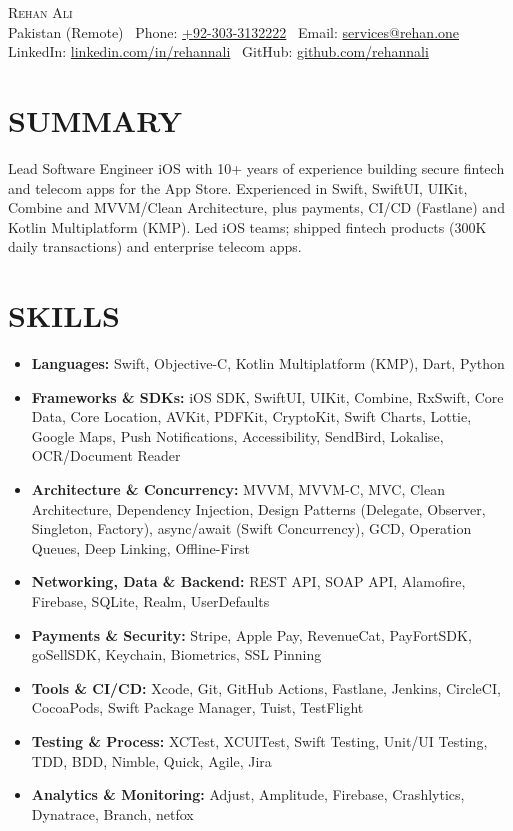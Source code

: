 \documentclass[a4paper,10pt]{article}
\newcommand{\resumeTechSkill}[2]{
    \item\small{
        \textbf{\small{#1:}} \small{#2} \\[-1pt]
    }\vspace{-2pt}
}
\newcommand{\resumeSkillsHeadingListStart}{\begin{itemize}[leftmargin=0.13in, label={}]}
\newcommand{\resumeSkillsHeadingListEnd}{\end{itemize}}
\begin{document}
\begin{center}
    {\Huge \scshape Rehan Ali} \\ \vspace{2pt}
    \small Pakistan (Remote) \textbar\ Phone: \href{tel:+923033132222}{+92-303-3132222} \textbar\ Email: \href{mailto:services@rehan.one}{services@rehan.one} \\
    \small LinkedIn: \href{https://linkedin.com/in/rehannali}{linkedin.com/in/rehannali} \textbar\ GitHub: \href{https://github.com/rehannali}{github.com/rehannali}
\end{center}
\vspace{-15pt}

\section{SUMMARY}
\small Lead Software Engineer iOS with 10+ years of experience building secure fintech and telecom apps for the App Store. Experienced in Swift, SwiftUI, UIKit, Combine and MVVM/Clean Architecture, plus payments, CI/CD (Fastlane) and Kotlin Multiplatform (KMP). Led iOS teams; shipped fintech products (300K daily transactions) and enterprise telecom apps.
\vspace{-5pt}

\section{SKILLS}
\resumeSkillsHeadingListStart
    \resumeTechSkill{Languages}{Swift, Objective-C, Kotlin Multiplatform (KMP), Dart, Python}
    \resumeTechSkill{Frameworks \& SDKs}{iOS SDK, SwiftUI, UIKit, Combine, RxSwift, Core Data, Core Location, AVKit, PDFKit, CryptoKit, Swift Charts, Lottie, Google Maps, Push Notifications, Accessibility, SendBird, Lokalise, OCR/Document Reader}
    \resumeTechSkill{Architecture \& Concurrency}{MVVM, MVVM-C, MVC, Clean Architecture, Dependency Injection, Design Patterns (Delegate, Observer, Singleton, Factory), async/await (Swift Concurrency), GCD, Operation Queues, Deep Linking, Offline-First}
    \resumeTechSkill{Networking, Data \& Backend}{REST API, SOAP API, Alamofire, Firebase, SQLite, Realm, UserDefaults}
    \resumeTechSkill{Payments \& Security}{Stripe, Apple Pay, RevenueCat, PayFortSDK, goSellSDK, Keychain, Biometrics, SSL Pinning}
    \resumeTechSkill{Tools \& CI/CD}{Xcode, Git, GitHub Actions, Fastlane, Jenkins, CircleCI, CocoaPods, Swift Package Manager, Tuist, TestFlight}
    \resumeTechSkill{Testing \& Process}{XCTest, XCUITest, Swift Testing, Unit/UI Testing, TDD, BDD, Nimble, Quick, Agile, Jira}
    \resumeTechSkill{Analytics \& Monitoring}{Adjust, Amplitude, Firebase, Crashlytics, Dynatrace, Branch, netfox}
\resumeSkillsHeadingListEnd
\end{document}
